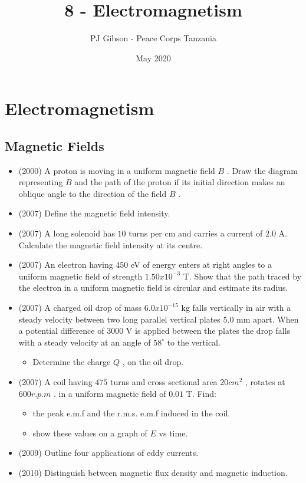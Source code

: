 \documentclass{article}
\title{\textbf{8 - Electromagnetism}}
\author{PJ Gibson - Peace Corps Tanzania}
\date{May 2020}
\newcommand{\mysection}[2]{\setcounter{section}{#1}\addtocounter{section}{-1}\section{#2}}
\begin{document}
\maketitle


\mysection{8}{Electromagnetism}

\subsection{Magnetic Fields}
\begin{itemize}
\item (2000)  A proton is moving in a uniform magnetic field $ B$ . Draw the diagram representing $ B$ and the path of the proton if its initial direction makes an oblique angle to the direction of the field $ B$ . 
\item (2007)  Define the magnetic field intensity.
\item (2007)  A long solenoid has $ 10$ turns per cm and carries a current of $ 2.0$ A.  Calculate the magnetic field intensity at its centre.
\item (2007)  An electron having $ 450$ eV of energy enters at right angles to a uniform magnetic field of strength $ 1.50x10^{-3}$ T.  Show that the path traced by the electron in a uniform magnetic field is circular and estimate its radius.
\item (2007)  A charged oil drop of mass $ 6.0x10^{-15}$ kg falls vertically in air with a steady velocity between two long parallel vertical plates $ 5.0$ mm apart.  When a potential difference of $ 3000$ V is applied between the plates the drop falls with a steady velocity at an angle of $ 58^{\circ}$ to the vertical.
 \begin{itemize}
\item Determine the charge $ Q$ , on the oil drop.
\end{itemize}
\item (2007)  A coil having $ 475$ turns and cross sectional area $ 20 cm^{2}$ , rotates at $ 600r.p.m$ . in a uniform magnetic field of $ 0.01$ T. Find:
 \begin{itemize}
\item the peak e.m.f and the r.m.s. e.m.f induced in the coil. 
\item show these values on a graph of $ E$ vs time. 
\end{itemize}
\item (2009)  Outline four applications of eddy currents.
\item (2010)  Distinguish between magnetic flux density and magnetic induction.

\end{itemize}
\end{document}

